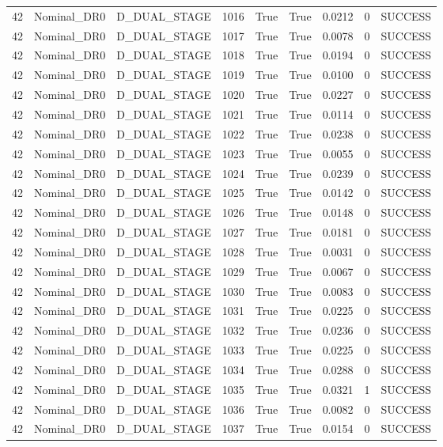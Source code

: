 \documentclass[11pt,a4paper,oneside]{book}
\begin{document}
\begin{longtable}{l l l l l l l l l}
42 & Nominal\_DR0 & D\_DUAL\_STAGE & 1016 & True & True & 0.0212 & 0 & SUCCESS \\
42 & Nominal\_DR0 & D\_DUAL\_STAGE & 1017 & True & True & 0.0078 & 0 & SUCCESS \\
42 & Nominal\_DR0 & D\_DUAL\_STAGE & 1018 & True & True & 0.0194 & 0 & SUCCESS \\
42 & Nominal\_DR0 & D\_DUAL\_STAGE & 1019 & True & True & 0.0100 & 0 & SUCCESS \\
42 & Nominal\_DR0 & D\_DUAL\_STAGE & 1020 & True & True & 0.0227 & 0 & SUCCESS \\
42 & Nominal\_DR0 & D\_DUAL\_STAGE & 1021 & True & True & 0.0114 & 0 & SUCCESS \\
42 & Nominal\_DR0 & D\_DUAL\_STAGE & 1022 & True & True & 0.0238 & 0 & SUCCESS \\
42 & Nominal\_DR0 & D\_DUAL\_STAGE & 1023 & True & True & 0.0055 & 0 & SUCCESS \\
42 & Nominal\_DR0 & D\_DUAL\_STAGE & 1024 & True & True & 0.0239 & 0 & SUCCESS \\
42 & Nominal\_DR0 & D\_DUAL\_STAGE & 1025 & True & True & 0.0142 & 0 & SUCCESS \\
42 & Nominal\_DR0 & D\_DUAL\_STAGE & 1026 & True & True & 0.0148 & 0 & SUCCESS \\
42 & Nominal\_DR0 & D\_DUAL\_STAGE & 1027 & True & True & 0.0181 & 0 & SUCCESS \\
42 & Nominal\_DR0 & D\_DUAL\_STAGE & 1028 & True & True & 0.0031 & 0 & SUCCESS \\
42 & Nominal\_DR0 & D\_DUAL\_STAGE & 1029 & True & True & 0.0067 & 0 & SUCCESS \\
42 & Nominal\_DR0 & D\_DUAL\_STAGE & 1030 & True & True & 0.0083 & 0 & SUCCESS \\
42 & Nominal\_DR0 & D\_DUAL\_STAGE & 1031 & True & True & 0.0225 & 0 & SUCCESS \\
42 & Nominal\_DR0 & D\_DUAL\_STAGE & 1032 & True & True & 0.0236 & 0 & SUCCESS \\
42 & Nominal\_DR0 & D\_DUAL\_STAGE & 1033 & True & True & 0.0225 & 0 & SUCCESS \\
42 & Nominal\_DR0 & D\_DUAL\_STAGE & 1034 & True & True & 0.0288 & 0 & SUCCESS \\
42 & Nominal\_DR0 & D\_DUAL\_STAGE & 1035 & True & True & 0.0321 & 1 & SUCCESS \\
42 & Nominal\_DR0 & D\_DUAL\_STAGE & 1036 & True & True & 0.0082 & 0 & SUCCESS \\
42 & Nominal\_DR0 & D\_DUAL\_STAGE & 1037 & True & True & 0.0154 & 0 & SUCCESS \\

\end{longtable}
\end{document}
